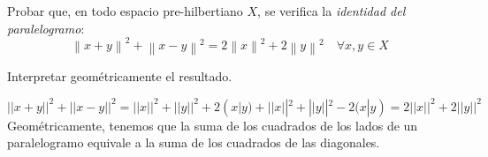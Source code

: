 \begin{ejercicio}
    Probar que, en todo espacio pre-hilbertiano $X$, se veriﬁca la \emph{identidad del paralelogramo}:
    \begin{equation*}
        \left\lVert x+y \right\rVert^{2} + \left\lVert x-y \right\rVert^{2}
        = 2\left\lVert x \right\rVert^{2} + 2\left\lVert y \right\rVert^{2} \quad \forall x,y \in X
    \end{equation*}

    Interpretar geométricamente el resultado.

    \begin{equation*}
        ||x+y||^2 + ||x-y||^2 = ||x||^2 + ||y||^2 + 2(x|y) + ||x||^2 + ||y||^2 - 2(x|y) = 2||x||^2 + 2||y||^2
    \end{equation*}
    Geométricamente, tenemos que la suma de los cuadrados de los lados de un paralelogramo equivale a la suma de los cuadrados de las diagonales.
    \begin{figure}[H]
        \centering
    \end{figure}
\end{ejercicio}


